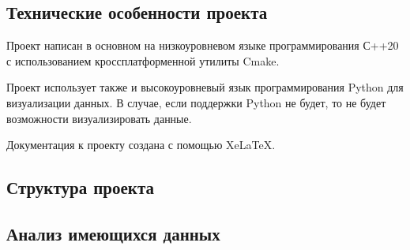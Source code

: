 \subsection{ \standartTitleFont
  Технические особенности проекта
}

{\standartFont

  \par Проект написан в основном на низкоуровневом языке программирования С++20 с использованием кроссплатформенной утилиты Cmake.

  \par Проект использует также и высокоуровневый язык программирования Python для визуализации данных. В случае, если поддержки Python не будет, то не будет возможности визуализировать данные.

  \par Документация к проекту создана с помощью XeLaTeX.

  \par
}

\subsection{ \standartTitleFont
  Структура проекта
}

{\standartFont

  \par

  \par
}


\subsection{ \standartTitleFont
  Анализ имеющихся данных
}


